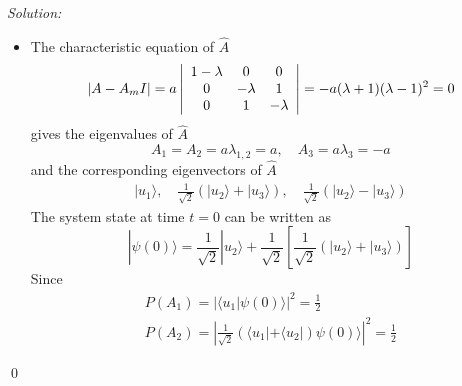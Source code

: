 \documentclass[12pt,a4paper]{article}
\newenvironment{sol}
    {\emph{Solution:}
    }
    {
    \qed
    }
\begin{document}
\begin{sol}
\begin{itemize}
\begin{align}
\begin{array}{ccc}
0&0&2\\
\end{array}\right)\left(\begin{array}{ccc}
1&0&0\\
0&2&0\\
0&0&2\\
\end{array}\right)\left(\begin{array}{c}
\frac{1}{\sqrt{2}}\\
\frac{1}{2}\\
\frac{1}{2}\\
\end{array}\right)\\
=&\frac{5}{2}\hbar^2\omega^2
\end{align}
The root-mean-square deviation of the energy is
\begin{equation}
\Delta H=\sqrt{\langle H^2\rangle-\langle H\rangle^2}=\frac{1}{2}\hbar\omega
\end{equation}
\item[(b)] The characteristic equation of $\hat{A}$
\begin{equation}
|A-A_mI|=a\left|\begin{array}{ccc}
1-\lambda&0&0\\
0&-\lambda&1\\
0&1&-\lambda\\
\end{array}\right|=-a(\lambda+1)(\lambda-1)^2=0\\
\end{equation}
gives the eigenvalues of $\hat{A}$
\begin{equation}
A_1=A_2=a\lambda_{1,2}=a,\quad A_3=a\lambda_3=-a
\end{equation}
and the corresponding eigenvectors of $\hat{A}$
\begin{gather}
|u_1\rangle,\quad\frac{1}{\sqrt{2}}(|u_2\rangle+|u_3\rangle),\quad\frac{1}{\sqrt{2}}(|u_2\rangle-|u_3\rangle)
\end{gather}
The system state at time $t=0$ can be written as
\begin{equation}
|\psi(0)\rangle=\frac{1}{\sqrt{2}}|u_2\rangle+\frac{1}{\sqrt{2}}\left[\frac{1}{\sqrt{2}}(|u_2\rangle+|u_3\rangle)\right]
\end{equation}
Since
\begin{gather}
P(A_1)=|\langle u_1|\psi(0)\rangle|^2=\frac{1}{2}\\
P(A_2)=|\frac{1}{\sqrt{2}}(\langle u_1|+\langle u_2|)\psi(0)\rangle|^2=\frac{1}{2}
\end{gather}

\end{itemize}
\end{sol}
\end{document}
